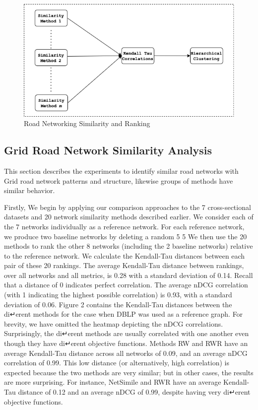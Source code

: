 \begin{figure}[h]
\centering
\includegraphics[width=1.25\textwidth,center]{picture/ranking.png}
\caption[Miniaturtrichter]{Road Networking Similarity and Ranking}
\label{fig:network ranking}
\end{figure}


\subsection{Grid Road Network Similarity Analysis}
This section describes the experiments to identify similar road networks with Grid road network patterns and structure, likewise groups of methods have similar behavior.

Firstly, 
We
begin by applying our comparison approaches to the 7
cross-sectional datasets and 20 network similarity methods
described earlier. We consider each of the 7 networks
individually as a reference network. For each reference
network, we produce two baseline networks by
deleting a random 5%
5%
We then use the 20 methods to rank the other
8 networks (including the 2 baseline networks) relative
to the reference network. We calculate the Kendall-Tau
distances between each pair of these 20 rankings. The
average Kendall-Tau distance between rankings, over all
networks and all metrics, is 0.28 with a standard deviation
of 0.14. Recall that a distance of 0 indicates perfect
correlation. The average nDCG correlation (with 1 indicating
the highest possible correlation) is 0.93, with
a standard deviation of 0.06. Figure 2 contains the
Kendall-Tau distances between the di↵erent methods
for the case when DBLP was used as a reference graph.
For brevity, we have omitted the heatmap depicting the
nDCG correlations. Surprisingly, the di↵erent methods
are usually correlated with one another even though
they have di↵erent objective functions. Methods RW
and RWR have an average Kendall-Tau distance across
all networks of 0.09, and an average nDCG correlation
of 0.99. This low distance (or alternatively, high correlation)
is expected because the two methods are very similar; but in other cases, the results are more surprising.
For instance, NetSimile and RWR have an average
Kendall-Tau distance of 0.12 and an average nDCG of
0.99, despite having very di↵erent objective functions. 

